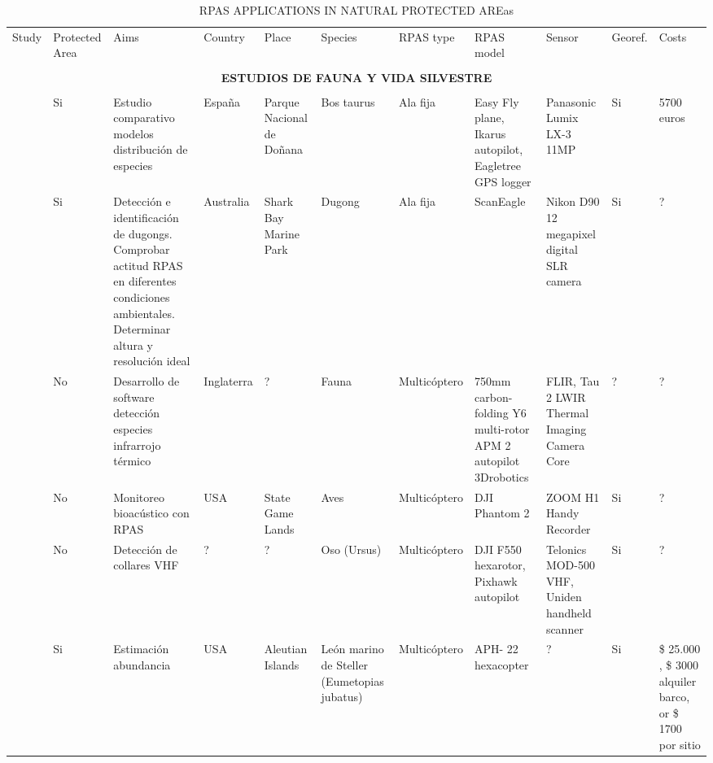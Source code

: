 \documentclass[]{interact}
\theoremstyle{plain}%
\theoremstyle{definition}
\theoremstyle{remark}
\begin{document}
\begin{landscape}
\begin{table}
\caption{RPAS APPLICATIONS IN  NATURAL PROTECTED AREas}
\tiny
\begin{tabular}{p{3cm}p{1.2cm}p{3cm}p{1cm}p{2cm}p{2cm}p{1cm}p{2cm}p{2cm}p{1cm}p{2cm}}

\cmidrule(r){1-11}

Study & Protected Area & Aims & Country & Place & Species & RPAS type &  RPAS model & Sensor & Georef. & Costs \\ \cmidrule(r){1-11}

\multicolumn{11}{c}{} \\
\multicolumn{11}{c}{ {\bf ESTUDIOS DE FAUNA Y VIDA SILVESTRE}  } \\
\multicolumn{11}{c}{} \\
\cite{pazmany_mulero_unmanned_2015}  & Si & Estudio comparativo modelos distribución de especies & España & Parque Nacional de Doñana & Bos taurus  & Ala fija & Easy Fly plane, Ikarus autopilot, Eagletree GPS logger & Panasonic Lumix LX-3 11MP & Si & 
5700 euros \\ 

\cite{hodgson_unmanned_2013} & Si & Detección e identificación de dugongs.  Comprobar actitud  RPAS en diferentes condiciones ambientales. Determinar altura y resolución ideal  & Australia & Shark Bay Marine Park & Dugong & Ala fija &  ScanEagle & Nikon D90 12 megapixel digital SLR camera  & Si & ?  \\ 

\cite{longmore_adapting_2017} & No & Desarrollo de software detección especies infrarrojo térmico & Inglaterra & ? & Fauna & Multicóptero & 750mm carbon-folding Y6 multi-rotor APM 2 autopilot 3Drobotics & FLIR, Tau 2 LWIR Thermal Imaging Camera Core  & ? & ?  \\ 

\cite{wilson_feasibility_2017}  & No & Monitoreo bioacústico con RPAS & USA & State Game Lands & Aves  & Multicóptero & DJI Phantom 2 & ZOOM H1 Handy Recorder  & Si & ? \\ 

\cite{bayram_active_2016}  &  No & Detección de collares VHF & ? & ? & Oso (Ursus)  & Multicóptero & DJI F550 hexarotor, Pixhawk autopilot & Telonics MOD-500 VHF, Uniden handheld scanner  & Si & ? \\ 

\cite{christie_unmanned_2016}  &  Si  & Estimación abundancia & USA &  Aleutian Islands & León marino de Steller (Eumetopias jubatus) & Multicóptero & APH- 22 hexacopter & ?  & Si & \$ 25.000 , \$ 3000 alquiler barco, or \$ 1700 por sitio \\ 


\end{tabular}
\end{table}
\end{landscape}
\end{document}
